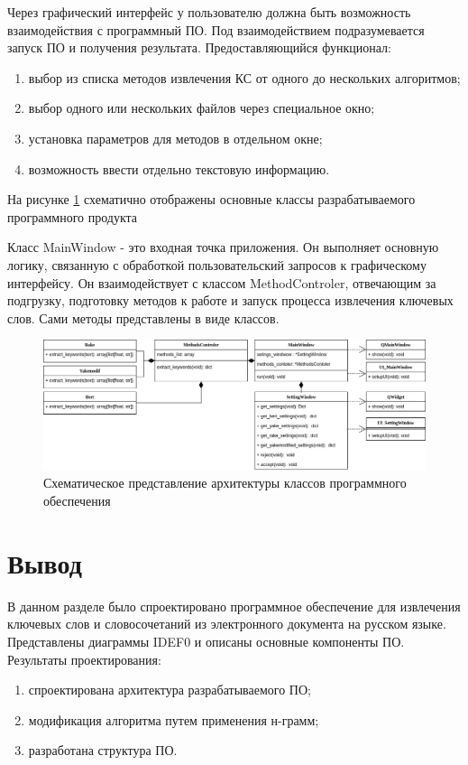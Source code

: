 Через графический интерфейс у пользователю должна быть возможность взаимодействия с программный ПО. 
Под взаимодействием подразумевается запуск ПО и получения результата.
Предоставляющийся функционал:
\begin{enumerate}
	\item выбор из списка методов извлечения КС от одного до нескольких алгоритмов;
	\item выбор одного или нескольких файлов через специальное окно;
	\item установка параметров для методов в отдельном окне;
	\item возможность ввести отдельно текстовую информацию.
\end{enumerate}

На рисунке \ref{fig:classdiagram} схематично отображены основные классы разрабатываемого программного продукта

Класс MainWindow - это входная точка приложения.
Он выполняет основную логику, связанную с обработкой пользовательский запросов к графическому интерфейсу.
Он взаимодействует с классом MethodControler, отвечающим за подгрузку, подготовку методов к работе и запуск процесса извлечения ключевых слов. Сами методы представлены в виде классов.

\begin{figure}[!h]
	\centering
	\includegraphics[width=1\linewidth]{src/img/class_diagram}
	\caption{Схематическое представление архитектуры классов программного обеспечения}
	\label{fig:classdiagram}
\end{figure}

\section{Вывод}
В данном разделе было спроектировано программное обеспечение для извлечения ключевых слов и словосочетаний из электронного документа на русском языке. 
Представлены диаграммы IDEF0 и описаны основные компоненты ПО.
Результаты проектирования:
\begin{enumerate}
	\item спроектирована архитектура разрабатываемого ПО;
	\item модификация алгоритма путем применения н-грамм;
	\item разработана структура ПО.
\end{enumerate}


